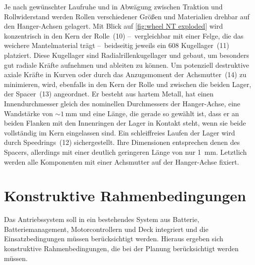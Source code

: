 		Je nach gewünschter Laufruhe und in Abwägung zwischen Traktion und Rollwiderstand werden Rollen verschiedener Größen und Materialien drehbar auf den Hanger-Achsen gelagert.
		Mit Blick auf \cref{fig:wheel NT exploded} wird konzentrisch in den Kern der Rolle~(10) --~vergleichbar mit einer Felge, die das weichere Mantelmaterial trägt --~beidseitig jeweils ein 608 Kugellager~(11) platziert.
		Diese Kugellager sind Radialrillenkugellager und gebaut, um besonders gut radiale Kräfte aufnehmen und ableiten zu können.
		Um potenziell destruktive axiale Kräfte in Kurven oder durch das Anzugsmoment der Achsmutter~(14) zu minimieren, wird, ebenfalls in den Kern der Rolle und zwischen die beiden Lager, der Spacer~(13) angeordnet.
		Er besteht aus hartem Metall, hat einen Innendurchmesser gleich des nominellen Durchmessers der Hanger-Achse, eine Wandstärke von \(\sim \qty{1}{\milli\metre}\) und eine Länge, die gerade so gewählt ist, dass er an beiden Flanken mit den Innenringen der Lager in Kontakt steht, wenn sie beide vollständig im Kern eingelassen sind.
		Ein schleiffreies Laufen der Lager wird durch Speedrings~(12) sichergestellt.
		Ihre Dimensionen entsprechen denen des Spacers, allerdings mit einer deutlich geringeren Länge von nur \qty{1}{\milli\metre}.
		Letztlich werden alle Komponenten mit einer Achsmutter auf der Hanger-Achse fixiert.
	\section{Konstruktive Rahmenbedingungen}\label{sec:constructive limitations}
		Das Antriebssystem soll in ein bestehendes System aus Batterie, Batteriemanagement, Motorcontrollern und Deck integriert und die Einsatzbedingungen müssen berücksichtigt werden.
		Hieraus ergeben sich konstruktive Rahmenbedingungen, die bei der Planung berücksichtigt werden müssen.
